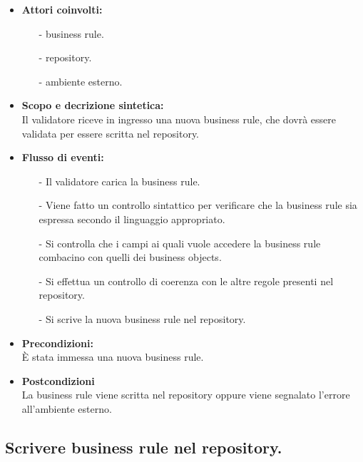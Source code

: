 \documentclass[11pt,titlepage,a4paper]{report}
\begin{document}
\begin{itemize}
\item{\textbf{Attori coinvolti:}}
\begin{itemize}
\item[-] business rule.
\item[-] repository.
\item[-] ambiente esterno.
\end{itemize}

\item{\textbf{Scopo e decrizione sintetica:}}\\
Il validatore riceve in ingresso una nuova business rule, che dovr\`a essere validata per essere scritta nel repository.

\item{\textbf{Flusso di eventi:}}
\begin{itemize}
 \item[-] Il validatore carica la business rule.
 \item[-] Viene fatto un controllo sintattico per verificare che la business rule sia espressa secondo il linguaggio  appropriato.
 \item[-] Si controlla che i campi ai quali vuole accedere la business rule combacino con quelli dei business objects.
 \item[-] Si effettua un controllo di coerenza con le altre regole presenti nel repository.
 \item[-] Si scrive la nuova business rule nel repository.
\end{itemize}

\item{\textbf{Precondizioni:}}\\
\`E stata immessa una nuova business rule.

\item{\textbf{Postcondizioni}}\\
La business rule viene scritta nel repository oppure viene segnalato l'errore all'ambiente esterno.

\end{itemize}

\subsection{Scrivere business rule nel repository.}
\end{document}
